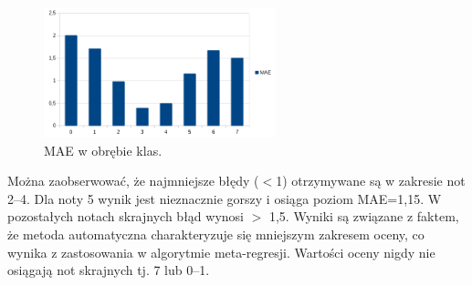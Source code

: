 \begin{figure}[]
	\centering
	\includegraphics[width=0.6\textwidth]{figures/cmScores_summary.png}
	\caption{MAE w obrębie klas.}\label{fig:cmscores}
\end{figure}

Można zaobserwować, że najmniejsze błędy ($<$1) otrzymywane są w zakresie not 2--4. Dla noty 5 wynik jest nieznacznie gorszy i osiąga poziom MAE=1,15. W pozostałych notach skrajnych błąd wynosi $>$ 1,5. Wyniki są związane z faktem, że metoda automatyczna charakteryzuje się mniejszym zakresem oceny, co wynika z zastosowania w algorytmie meta-regresji. Wartości oceny nigdy nie osiągają not skrajnych tj. 7 lub 0--1. 

